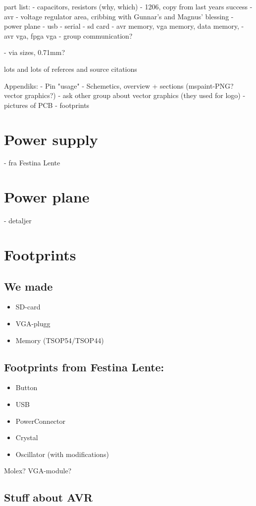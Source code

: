 part list:
- capacitors, resistors (why, which)
	- 1206, copy from last years success
- avr
- voltage regulator area, cribbing with Gunnar's and Magnus' blessing
- power plane
- usb
- serial
- sd card
- avr memory, vga memory, data memory, 
- avr vga, fpga vga
- group communication?

- via sizes, 0.71mm?

lots and lots of referces and source citations


Appendiks:
- Pin "usage"
- Schemetics, overview + sections (mspaint-PNG? vector graphics?)
- ask other group about vector graphics (they used for logo)
- pictures of PCB
- footprints


\section {Power supply} 
- fra Festina Lente

\section {Power plane}
- detaljer

\section {Footprints}

\subsection {We made}
\begin{itemize}
\item SD-card
\item VGA-plugg
\item Memory (TSOP54/TSOP44)
\end{itemize}

\subsection {Footprints from Festina Lente:}
\begin{itemize}
\item Button
\item USB
\item PowerConnector
\item Crystal
\item Oscillator (with modifications)
\end{itemize}
Molex?
VGA-module?

\subsection {Stuff about AVR}
